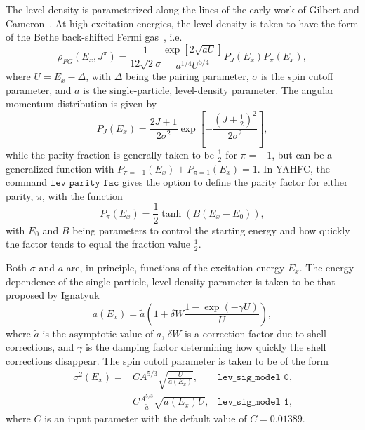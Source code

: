 \documentclass[
10pt,
showpacs,preprintnumbers,footinbib,
amsfonts,amsmath,amssymb,
aps,
prc,twocolumn,groupedaddress,superscriptaddress,
showkeys,
nofootinbib
]{revtex4-1}
\begin{document}
The level density is parameterized along the lines of the early work of Gilbert and Cameron~\cite{Gilbert:1965}. At high excitation energies, the level density is taken to have the form of the Bethe back-shifted Fermi gas~\cite{Bethe:1937}, i.e.
\begin{equation}
\rho_{FG}(E_x,J^\pi) = \frac{1}{12\sqrt{2}\sigma}\frac{\exp\left[2\sqrt{aU}\right ]}{a^{1/4}U^{5/4}} P_J(E_x) P_\pi(E_x),
\label{eq:rho_BFM}
\end{equation}
where $U=E_x - \Delta$, with $\Delta$ being the pairing parameter, $\sigma$ is the spin cutoff parameter, and $a$ is the single-particle, level-density parameter. The angular momentum distribution is given by
\begin{equation}
P_J(E_x) = \frac{2J+1}{2\sigma^2}\exp \left [ - \frac{(J+\frac{1}{2})^2}{2\sigma^2} \right ],
\label{eq:J_prob}
\end{equation}
while the parity fraction is generally taken to be $\frac{1}{2}$ for $\pi = \pm 1$, but can be a generalized function with $P_{\pi=-1}(E_x) + P_{\pi=1}(E_x) = 1$.  In YAHFC, the command ${\texttt{lev\_parity\_fac}}$ gives the option to define the parity factor for either parity, $\pi$, with the function 
\begin{equation}
P_\pi(E_x) = \frac{1}{2}\tanh(B(E_x-E_0)),
\label{eq:parity}
\end{equation}
with $E_0$ and $B$ being parameters to control the starting energy and how quickly the factor tends to equal the fraction value $\frac{1}{2}$.

Both $\sigma$ and $a$ are, in principle, functions of the excitation energy $E_x$. The energy dependence of the single-particle, level-density parameter is taken to be that proposed by Ignatyuk
\begin{equation}
a(E_x) = \tilde a \left ( 1+\delta W\frac{1-\exp(-\gamma U)}{U}\right),
\end{equation}
where $\tilde a$ is the asymptotic value of $a$, $\delta W$ is a correction factor due to shell corrections, and $\gamma$ is the damping factor determining how quickly the shell corrections disappear. The spin cutoff parameter is taken to be of the form
\begin{align}
\label{eq:sig_0}
\sigma^2(E_x) = & CA^{5/3}\sqrt{\frac{U}{a(E_x)}}, &{\texttt{lev\_sig\_model 0}}, \\
\label{eq:sig_1}
 & C\frac{A^{5/3}}{\tilde a}\sqrt{a(E_x)U}, &{\texttt{lev\_sig\_model 1}},
\end{align}
where $C$ is an input parameter with the default value of $C=0.01389$.
\end{document}
